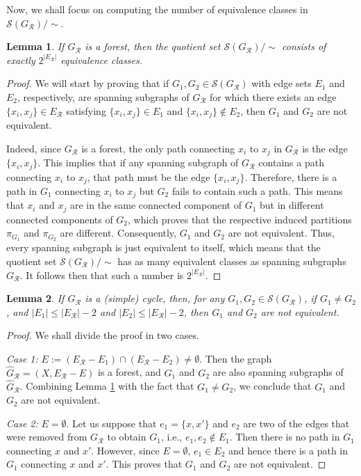 \documentclass[12pt]{extarticle}
\newtheorem{Lemma}{Lemma}
\begin{document}
	Now, we shall focus on computing the number of equivalence classes in $\mathcal{S}(G_{\mathcal{R}})/\sim$.
	
	\begin{Lemma}\label{forest}
		If $G_{\mathcal{R}}$ is a forest, then the quotient set $\mathcal{S}(G_{\mathcal{R}})/\sim$ consists of exactly $2^{|E_{\mathcal{R}}|}$ equivalence classes.
	\end{Lemma}
	\begin{proof}
		We will start by proving that if $G_1,G_2\in\mathcal{S}(G_{\mathcal{R}})$ with edge sets $E_1$ and $E_2$, respectively, are spanning subgraphs of $G_{\mathcal{R}}$ for which there exists an edge $\{x_i, x_j\} \in E_{\mathcal{R}}$ satisfying $\{x_i, x_j\} \in E_1$ and $ \{x_i, x_j\}\notin E_2$, then $G_1$ and $G_2$ are not equivalent. 
		
		Indeed, since $G_{\mathcal{R}}$ is a forest, the only path connecting $x_i$ to $x_j$ in $G_{\mathcal{R}}$ is the edge $\{x_i, x_j\}$. This implies that if any spanning subgraph of $G_{\mathcal{R}}$ contains a path connecting $x_i$ to $x_j$, that path must be the edge  $\{x_i, x_j\}$. Therefore, there is a path in $G_1$ connecting $x_i$ to $x_j$ but $G_2$ fails to contain such a path. This means that $x_i$ and $x_j$ are in the same connected component of $G_1$ but in different connected components of $G_2$, which proves that the respective induced partitions $\pi_{G_1}$ and $\pi_{G_2}$ are different. Consequently, $G_1$ and $G_2$ are not equivalent. Thus, every spanning subgraph is just equivalent to itself, which means that the quotient set $\mathcal{S}(G_{\mathcal{R}})/\sim$ has as many equivalent classes as spanning subgraphs $G_{\mathcal{R}}$. It follows then that such a number is $2^{|E_{\mathcal{R}}|}$.
	\end{proof}
	
	\begin{Lemma}\label{cycle1}
		If $G_{\mathcal{R}}$ is a (simple) cycle, then, for any $G_1, G_2\in\mathcal{S}(G_{\mathcal{R}})$,  if $G_1\neq G_2$, and $|E_1| \leq |E_{\mathcal{R}}| - 2$ and $|E_2| \leq |E_{\mathcal{R}}| - 2$, then $G_1$ and $G_2$ are not equivalent.
	\end{Lemma}
	\begin{proof}
		We shall divide the proof in two cases.
		
		\emph{Case 1:} $E:=(E_{\mathcal{R}}-E_1)\cap (E_{\mathcal{R}}-E_2)\neq\emptyset$. Then the graph $\hat{G}_{\mathcal{R}}=(X, E_{\mathcal{R}}-E)$ is a forest, and $G_1$ and $G_2$ are also spanning subgraphs of $\hat{G}_{\mathcal{R}}$. Combining Lemma \ref{forest} with the fact that $G_1\neq G_2$, we conclude that $G_1$ and $G_2$ are not equivalent. 
		
		\emph{Case 2:} $E=\emptyset$. Let us suppose that $e_1=\{x,x'\}$ and $e_2 $ are two of the edges that were removed from $G_{\mathcal{R}}$ to obtain $G_1$, i.e., $e_1,e_2\notin E_1$. Then there is no path in $G_1$ connecting $x$ and $x'$. However, since $E=\emptyset$, $e_1\in E_2$ and hence there is a path in $G_1$ connecting $x$ and $x'$.
		This proves that $G_1$ and $G_2$ are not equivalent.
	\end{proof}
	
\end{document}
